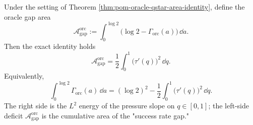 \begin{theorem}\label{thm:pom-oracle-gap-area-law-energy}
Under the setting of Theorem \ref{thm:pom-oracle-qstar-area-identity}, define the oracle gap area
\[
\mathcal{A}^{\mathrm{orc}}_{\mathrm{gap}}
:=\int_{0}^{\log 2}\bigl(\log 2-\Gamma_{\mathrm{orc}}(a)\bigr)\,\dd a.
\]
Then the exact identity holds
\[
\boxed{\;
\mathcal{A}^{\mathrm{orc}}_{\mathrm{gap}}
=\frac12\int_{0}^{1}\bigl(\tau'(q)\bigr)^2\,\dd q.\;}
\]
Equivalently,
\[
\boxed{\;
\int_{0}^{\log 2}\Gamma_{\mathrm{orc}}(a)\,\dd a
=(\log 2)^2-\frac12\int_{0}^{1}\bigl(\tau'(q)\bigr)^2\,\dd q.\;}
\]
The right side is the \(L^2\) energy of the pressure slope on \(q\in[0,1]\); the left-side deficit \(\mathcal{A}^{\mathrm{orc}}_{\mathrm{gap}}\) is the cumulative area of the "success rate gap."
\end{theorem}
